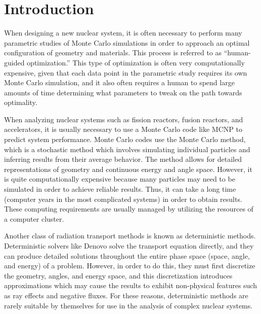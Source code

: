 \chapter{Introduction}
\label{chap:intro}

When designing a new nuclear system, it is often necessary to perform many parametric studies of Monte Carlo simulations in order to approach an optimal configuration of geometry and materials.
This process is referred to as ``human-guided optimization.''
This type of optimization is often very computationally expensive, given that each data point in the parametric study requires its own Monte Carlo simulation, and it also often requires a human to spend large amounts of time determining what parameters to tweak on the path towards optimality.

When analyzing nuclear systems such as fission reactors, fusion reactors, and accelerators, it is usually necessary to use a Monte Carlo code like MCNP \cite{mcnp620} to predict system performance.
Monte Carlo codes use the Monte Carlo method, which is a stochastic method which involves simulating individual particles and inferring results from their average behavior.
The method allows for detailed representations of geometry and continuous energy and angle space.
However, it is quite computationally expensive because many particles may need to be simulated in order to achieve reliable results.
Thus, it can take a long time (computer years in the most complicated systems) in order to obtain results.
These computing requirements are usually managed by utilizing the resources of a computer cluster.

Another class of radiation transport methods is known as deterministic methods.
Deterministic solvers like Denovo \cite{denovo} solve the transport equation directly, and they can produce detailed solutions throughout the entire phase space (space, angle, and energy) of a problem.
However, in order to do this, they must first discretize the geometry, angles, and energy space, and this discretization introduces approximations which may cause the results to exhibit non-physical features such as ray effects and negative fluxes.
For these reasons, deterministic methods are rarely suitable by themselves for use in the analysis of complex nuclear systems.

